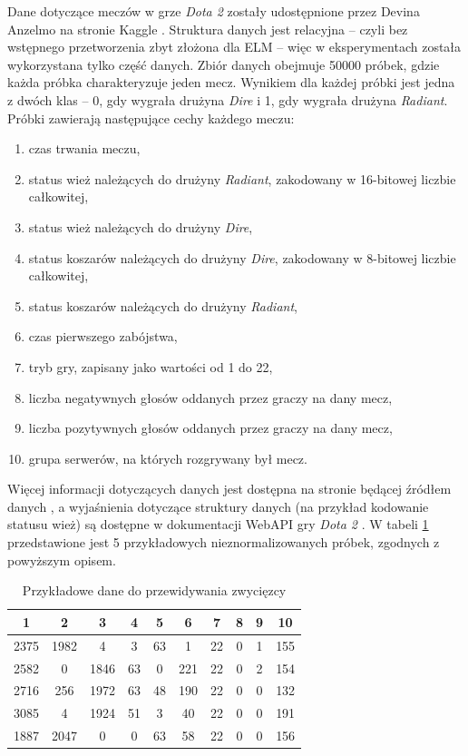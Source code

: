 \documentclass{article}
\begin{document}
Dane dotyczące meczów w grze \textit{Dota 2} zostały udostępnione przez Devina Anzelmo na stronie Kaggle \cite{dota2}. Struktura danych jest relacyjna -- czyli bez wstępnego przetworzenia zbyt złożona dla ELM -- więc w eksperymentach została wykorzystana tylko część danych. Zbiór danych obejmuje 50000 próbek, gdzie każda próbka charakteryzuje jeden mecz.  Wynikiem dla każdej próbki jest jedna z dwóch klas -- 0, gdy wygrała drużyna \textit{Dire} i 1, gdy wygrała drużyna \textit{Radiant}. Próbki zawierają następujące cechy każdego meczu:
\begin{enumerate}
\item czas trwania meczu,
\item status wież należących do drużyny \textit{Radiant}, zakodowany w 16-bitowej liczbie całkowitej,
\item status wież należących do drużyny \textit{Dire},
\item status koszarów należących do drużyny \textit{Dire}, zakodowany w 8-bitowej liczbie całkowitej,
\item status koszarów należących do drużyny \textit{Radiant},
\item czas pierwszego zabójstwa,
\item tryb gry, zapisany jako wartości od 1 do 22,
\item liczba negatywnych głosów oddanych przez graczy na dany mecz,
\item liczba pozytywnych głosów oddanych przez graczy na dany mecz,
\item grupa serwerów, na których rozgrywany był mecz.
\end{enumerate}
Więcej informacji dotyczących danych jest dostępna na stronie będącej źródłem danych \cite{dota2}, a wyjaśnienia dotyczące struktury danych (na przykład kodowanie statusu wież) są dostępne w dokumentacji WebAPI gry \textit{Dota 2} \cite{dota2_webapi}. W tabeli \ref{dota2_first_5} przedstawione jest 5 przykładowych nieznormalizowanych próbek, zgodnych z powyższym opisem.
\begin{table}[H]
\caption{Przykładowe dane do przewidywania zwycięzcy}
\label{dota2_first_5}
\centering
\begin{tabular}{|c|c|c|c|c|c|c|c|c|c|}
\hline
\textbf{1} & \textbf{2} & \textbf{3} & \textbf{4} & \textbf{5} & \textbf{6} & \textbf{7} & \textbf{8} & \textbf{9} & \textbf{10} \\
\hline
2375 & 1982 & 4 & 3 & 63 & 1 & 22 & 0 & 1 & 155 \\
2582 & 0 & 1846 & 63 & 0 & 221 & 22 & 0 & 2 & 154 \\
2716 & 256 & 1972 & 63 & 48 & 190 & 22 & 0 & 0 & 132 \\
3085 & 4 & 1924 & 51 & 3 & 40 & 22 & 0 & 0 & 191 \\
1887 & 2047 & 0 & 0 & 63 & 58 & 22 & 0 & 0 & 156 \\
\hline
\end{tabular}
\end{table}
\end{document}
